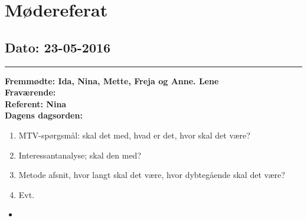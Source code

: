 \chapter{Mødereferat}

\section{Dato: 23-05-2016}
\hrule
\textbf{Fremmødte: Ida, Nina, Mette, Freja og Anne. Lene} \\
\textbf{Fraværende:} \\
\textbf{Referent: Nina } \\
\textbf{Dagens dagsorden: }
\begin{enumerate}
\item MTV-spørgsmål: skal det med, hvad er det, hvor skal det være?
\item Interessantanalyse; skal den med?
\item Metode afsnit, hvor langt skal det være, hvor dybtegående skal det være?
\item Evt.
\end{enumerate}

\begin{itemize}
\item 
\end{itemize}

\newpage


